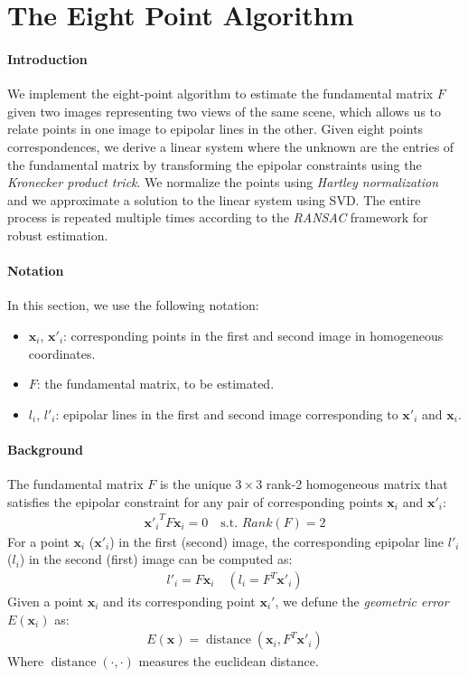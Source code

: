 \section{The Eight Point Algorithm}

\paragraph{Introduction} We implement the eight-point algorithm to estimate the fundamental matrix $F$ given two images representing two views of the same scene, which allows us to relate points in one image to epipolar lines in the other. Given eight points correspondences, we derive a linear system where the unknown are the entries of the fundamental matrix by transforming the epipolar constraints using the \textit{Kronecker product trick}. We normalize the points using \textit{Hartley normalization} and we approximate a solution to the linear system using SVD. The entire process is repeated multiple times according to the \textit{RANSAC} framework for robust estimation.

\paragraph{Notation} In this section, we use the following notation:

\begin{itemize}
    \item $\mathbf{x}_i$, $\mathbf{x}'_i$: corresponding points in the first and second image in homogeneous coordinates.
    \item $F$: the fundamental matrix, to be estimated.
    \item $l_i$, $l'_i$: epipolar lines in the first and second image corresponding to $\mathbf{x}'_i$ and $\mathbf{x}_i$.
\end{itemize}

\paragraph{Background}

The fundamental matrix $F$ is the unique $3 \times 3$ rank-2 homogeneous matrix that satisfies the epipolar constraint for any pair of corresponding points $\mathbf{x}_i$ and $\mathbf{x}'_i$:
\begin{align*}
    {\mathbf{x}'_i}^T F \mathbf{x}_i = 0 \quad \text{s.t. } Rank(F)=2
\end{align*}
For a point $\mathbf{x}_i$ ($ \mathbf{x}'_i$) in the first (second) image, the corresponding epipolar line $l'_i$ ($l_i$) in the second (first) image can be computed as:
\begin{align*}
l'_i = F \mathbf{x}_i \quad (l_i = F^T \mathbf{x}'_i)
\end{align*}
Given a point $\mathbf{x}_i$ and its corresponding point $\mathbf{x}_i'$, we defune the \textit{geometric error} $E(\mathbf{x}_i)$ as:
\begin{align*}
    E(\mathbf{x}) = \operatorname{distance}(\mathbf{x}_i, F^T \mathbf{x}'_i)
\end{align*}
Where $\operatorname{distance}(\cdot,\cdot)$ measures the euclidean distance.

